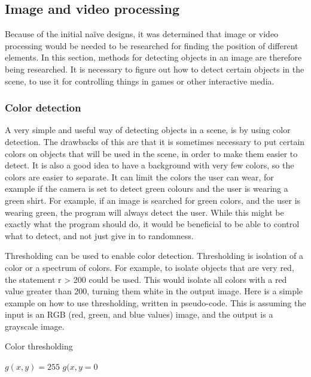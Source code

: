\subsection{Image and video processing}
Because of the initial naïve designs, it was determined that image or video processing would be needed to be researched for finding the position of different elements. In this section, methods for detecting objects in an image are therefore being researched. It is necessary to figure out how to detect certain objects in the scene, to use it for controlling things in games or other interactive media.

\subsubsection{Color detection}
A very simple and useful way of detecting objects in a scene, is by using color detection. The drawbacks of this are that it is sometimes necessary to put certain colors on objects that will be used in the scene, in order to make them easier to detect. It is also a good idea to have a background with very few colors, so the colors are easier to separate. It can limit the colors the user can wear, for example if the camera is set to detect green colours and the user is wearing a green shirt. For example, if an image is searched for green colors, and the user is wearing green, the program will always detect the user. While this might be exactly what the program should do, it would be beneficial to be able to control what to detect, and not just give in to randomness.

Thresholding can be used to enable color detection. Thresholding is isolation of a color or a spectrum of colors. For example, to isolate objects that are very red, the statement r > 200 could be used. This would isolate all colors with a red value greater than 200, turning them white in the output image. Here is a simple example on how to use thresholding, written in pseudo-code. This is assuming the input is an RGB (red, green, and blue values) image, and the output is a grayscale image.

\begin{algorithm}[H]
\caption{Color thresholding}
\label{code:threshold}
\begin{algorithmic}
\STATE $g(x,y)=255$
\ELSE
\STATE $g(x,y = 0$
\ENDIF
\end{algorithmic}
\end{algorithm}

